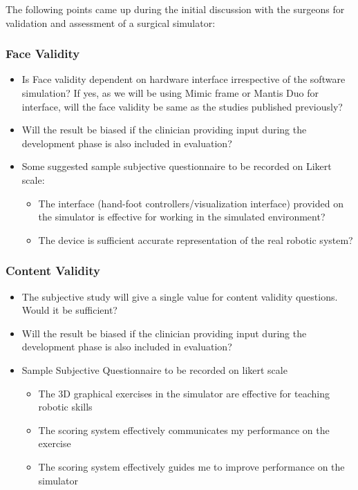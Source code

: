 The following points came up during the initial discussion with the surgeons for validation and assessment of a surgical simulator:

\subsubsection{Face Validity}
\label{sssec:face_validity}
\begin{itemize}
  \item Is Face validity dependent on hardware interface irrespective of the software simulation? If yes, as we will be using Mimic frame or Mantis Duo for interface, will the face validity be same as the studies published previously?
  \item Will the result be biased if the clinician providing input during the development phase is also included in evaluation?
  \item Some suggested sample subjective questionnaire to be recorded on Likert scale:
  \begin{itemize}
    \item The interface (hand-foot controllers/visualization interface) provided on the simulator is effective for working in the simulated environment?
    \item The device is sufficient accurate representation of the real robotic system?
  \end{itemize}
\end{itemize}


\subsubsection{Content Validity}
\label{sssec:content_validity}
\begin{itemize}
  \item The subjective study will give a single value for content validity questions. Would it be sufficient?
  \item Will the result be biased if the clinician providing input during the development phase is also included in evaluation?
  \item Sample Subjective Questionnaire to be recorded on likert scale
  \begin{itemize}
    \item The 3D graphical exercises in the simulator are effective for teaching robotic skills
    \item The scoring system effectively communicates my performance on the exercise
    \item The scoring system effectively guides me to improve performance on the simulator
  \end{itemize}
\end{itemize}

